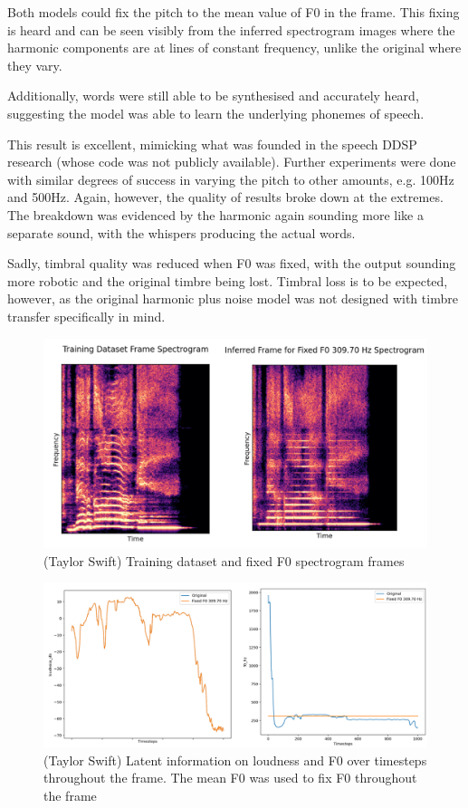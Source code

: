 Both models could fix the pitch to the mean value of F0 in the frame. This fixing is heard and can be seen visibly from the inferred spectrogram images where the harmonic components are at lines of constant frequency, unlike the original where they vary.

Additionally, words were still able to be synthesised and accurately heard, suggesting the model was able to learn the underlying phonemes of speech.

This result is excellent, mimicking what was founded in the speech DDSP research\cite{SpeechDDSP} (whose code was not publicly available). Further experiments were done with similar degrees of success in varying the pitch to other amounts, e.g. 100Hz and 500Hz. Again, however, the quality of results broke down at the extremes. The breakdown was evidenced by the harmonic again sounding more like a separate sound, with the whispers producing the actual words.

Sadly, timbral quality was reduced when F0 was fixed, with the output sounding more robotic and the original timbre being lost. Timbral loss is to be expected, however, as the original harmonic plus noise model was not designed with timbre transfer specifically in mind\cite{OriginalDDSP}.

\begin{figure}[H]
    \centering
    \includegraphics[width=\textwidth]{research/results/TaylorSwift/FixedF0.png}
    \caption{(Taylor Swift) Training dataset and fixed F0 spectrogram frames}
\end{figure}

\begin{figure}[H]
    \centering
    \includegraphics[width=\textwidth]{research/results/TaylorSwift/FixedF0Graphs.png}
    \caption{(Taylor Swift) Latent information on loudness and F0 over timesteps throughout the frame. The mean F0 was used to fix F0 throughout the frame}
\end{figure}

